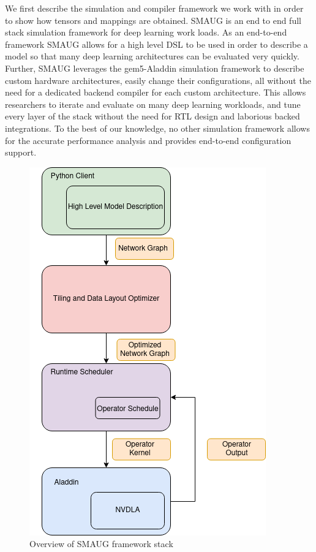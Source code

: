 We first describe the simulation and compiler framework we work with in order
to show how tensors and mappings are obtained. SMAUG \cite{smaug} is an end to
end full stack simulation framework for deep learning work loads. As an
end-to-end framework SMAUG allows for a high level DSL to be used in order to
describe a model so that many deep learning architectures can be evaluated very
quickly. Further, SMAUG leverages the gem5-Aladdin \cite{aladdin} simulation
framework to describe custom hardware architectures, easily change their
configurations, all without the need for a dedicated backend compiler for each
custom architecture. This allows researchers to iterate and evaluate on many
deep learning workloads, and tune every layer of the stack without the need for
RTL design and laborious backed integrations. To the best of our knowledge, no
other simulation framework allows for the accurate performance analysis and
provides end-to-end configuration support.
\begin{figure}[thb!]
\centering
\includegraphics[scale=0.7]{Figures/smaug_stack.png}
\decoRule
\caption[Overview of SMAUG]{Overview of SMAUG framework stack}
\label{fig:SmaugStack}
\end{figure}


